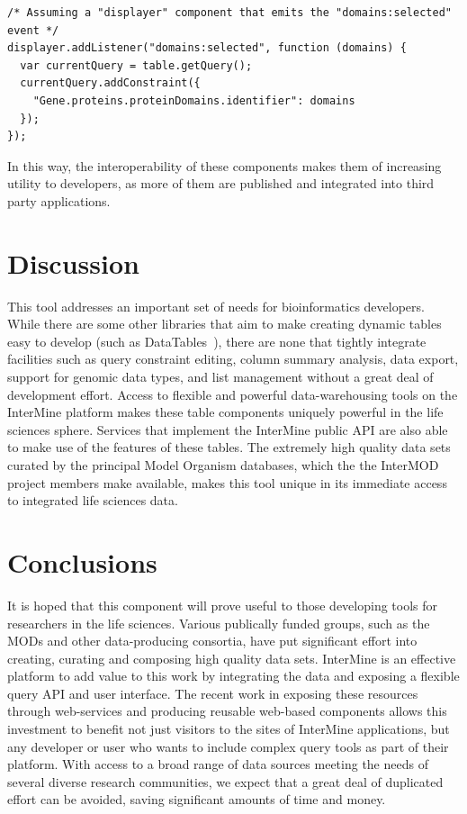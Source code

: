 \documentclass[10pt,a4paper,twocolumn]{article}
\begin{document}
\begin{lstlisting}[caption={Integrating with Other Components - Example 2}, label={code:modify-query}]
/* Assuming a "displayer" component that emits the "domains:selected" event */
displayer.addListener("domains:selected", function (domains) {
  var currentQuery = table.getQuery();
  currentQuery.addConstraint({
    "Gene.proteins.proteinDomains.identifier": domains
  });
});
\end{lstlisting}

In this way, the interoperability of these components makes them of increasing
utility to developers, as more of them are published and integrated into third
party applications.

\section*{Discussion}

This tool addresses an important set of needs for bioinformatics developers.
While there are some other libraries that aim to make creating dynamic tables
easy to develop (such as DataTables~\cite{site:datatables}), there are none that
tightly integrate facilities such as query constraint editing, column summary
analysis, data export, support for genomic data types, and list management
without a great deal of development effort. Access to flexible and powerful
data-warehousing tools on the InterMine platform makes these table components
uniquely powerful in the life sciences sphere. Services that implement the
InterMine public API are also able to make use of the features of these tables.
The extremely high quality data sets curated by the principal Model Organism
databases, which the the InterMOD project members make available, makes this
tool unique in its immediate access to integrated life sciences data. 

\section*{Conclusions}

It is hoped that this component will prove useful to those developing tools for
researchers in the life sciences. Various publically funded groups, such as the
MODs and other data-producing consortia, have put significant effort into
creating, curating and composing high quality data sets. InterMine is an
effective platform to add value to this work by integrating the data and
exposing a flexible query API and user interface. The recent work in exposing
these resources through web-services and producing reusable web-based components
allows this investment to benefit not just visitors to the sites of InterMine
applications, but any developer or user who wants to include complex query tools
as part of their platform. With access to a broad range of data sources meeting
the needs of several diverse research communities, we expect that a great deal
of duplicated effort can be avoided, saving significant amounts of time and
money.
\end{document}
